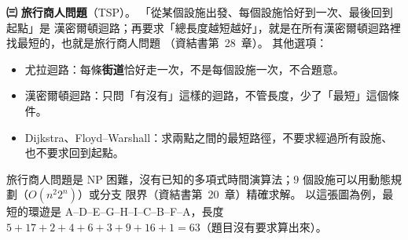 \begin{pastsoln}
\textbf{㈢} \textbf{旅行商人問題}（TSP）。 「從某個設施出發、每個設施恰好到一次、最後回到起點」是
漢密爾頓迴路；再要求「總長度越短越好」，就是在所有漢密爾頓迴路裡找最短的，也就是旅行商人問題
（資結書第~28~章）。 其他選項：
\begin{itemize}
\item 尤拉迴路：每條\textbf{街道}恰好走一次，不是每個設施一次，不合題意。
\item 漢密爾頓迴路：只問「有沒有」這樣的迴路，不管長度，少了「最短」這個條件。
\item Dijkstra、Floyd--Warshall：求兩點之間的最短路徑，不要求經過所有設施、也不要求回到起點。
\end{itemize}
旅行商人問題是 NP 困難，沒有已知的多項式時間演算法；$9$ 個設施可以用動態規劃（$O(n^2 2^n)$）或分支
限界（資結書第~20~章）精確求解。 以這張圖為例，最短的環遊是 A--D--E--G--H--I--C--B--F--A，長度
$5 + 17 + 2 + 4 + 6 + 3 + 9 + 16 + 1 = 63$（題目沒有要求算出來）。
\end{pastsoln}
